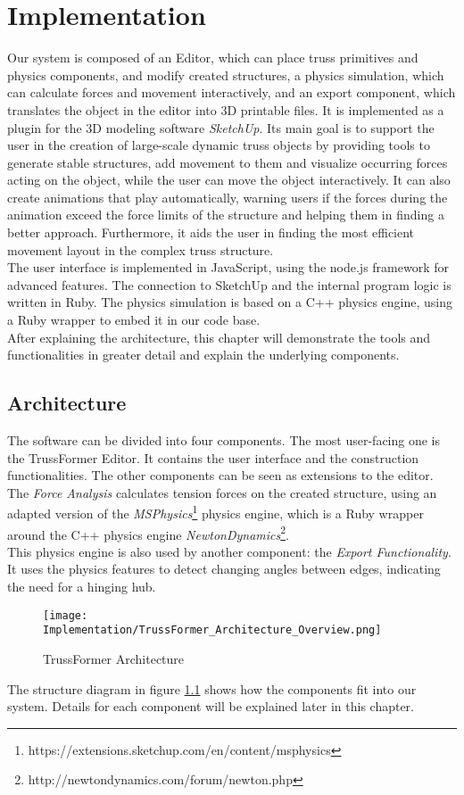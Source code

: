 \chapter{Implementation}\label{ch:implementation}
Our system is composed of an Editor, which can place truss primitives and physics components, and modify created structures, a physics simulation, which can calculate forces and movement interactively, and an export component, which translates the object in the editor into 3D printable files. It is implemented as a plugin for the 3D modeling software \textit{SketchUp}. Its main goal is to support the user in the creation of large-scale dynamic truss objects by providing tools to generate stable structures, add movement to them and visualize occurring forces acting on the object, while the user can move the object interactively. It can also create animations that play automatically, warning users if the forces during the animation exceed the force limits of the structure and helping them in finding a better approach. Furthermore, it aids the user in finding the most efficient movement layout in the complex truss structure.\\
The user interface is implemented in JavaScript, using the node.js framework for advanced features. The connection to SketchUp and the internal program logic is written in Ruby. The physics simulation is based on a C++ physics engine, using a Ruby wrapper to embed it in our code base.\\
After explaining the architecture, this chapter will demonstrate the tools and functionalities in greater detail and explain the underlying components.

\section{Architecture}
The software can be divided into four components. The most user-facing one is the TrussFormer Editor. It contains the user interface and the construction functionalities. The other components can be seen as extensions to the editor. The \textit{Force Analysis} calculates tension forces on the created structure, using an adapted version of the \textit{MSPhysics}\footnote{https://extensions.sketchup.com/en/content/msphysics} physics engine, which is a Ruby wrapper around the C++ physics engine \textit{NewtonDynamics}\footnote{http://newtondynamics.com/forum/newton.php}.\\
This physics engine is also used by another component: the \textit{Export Functionality}. It uses the physics features to detect changing angles between edges, indicating the need for a hinging hub.
\begin{figure}[!h]
    \texttt{[image: Implementation/TrussFormer\_Architecture\_Overview.png]}
    \centering
    \caption{TrussFormer Architecture}
    \label{fig:architecture}
\end{figure}
The structure diagram in figure \ref{fig:architecture} shows how the components fit into our system. Details for each component will be explained later in this chapter.

